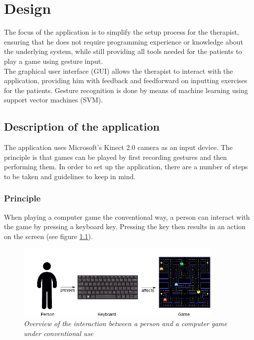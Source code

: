 \chapter{Design}
\label{chapter: design}

The focus of the application is to simplify the setup process for the therapist, ensuring that he does not require programming experience or knowledge about the underlying system, while still providing all tools needed for the patients to play a game using gesture input.\\

The graphical user interface (GUI) allows the therapist to interact with the application, providing him with feedback and feedforward on inputting exercises for the patients. Gesture recognition is done by means of machine learning using support vector machines (SVM).


\section{Description of the application}

The application uses Microsoft's Kinect 2.0 camera as an input device. The principle is that games can be played by first recording gestures and then performing them. In order to set up the application, there are a number of steps to be taken and guidelines to keep in mind.


\subsection{Principle}

When playing a computer game the conventional way, a person can interact with the game by pressing a keyboard key. Pressing the key then results in an action on the screen (see figure \ref{fig: overview_basic_interaction}).\\

\begin{figure}[H]
\begin{center}
\includegraphics[width=10cm]{Concept1.png}
\caption{\emph{Overview of the interaction between a person and a computer game under conventional use}}
\label{fig: overview_basic_interaction}
\end{center}
\end{figure}

